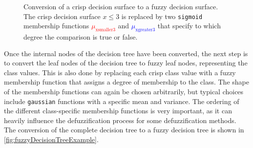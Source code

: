 \begin{figure}[H]
    \centering
    \caption[Conversion of crisp tree node into fuzzy tree node]{Conversion of a crisp decision surface to a fuzzy decision surface. The crisp decision surface $x \leq 3$ is replaced by two \texttt{sigmoid} membership functions \textcolor{red}{$\mu_{\text{xsmaller3}}$} and \textcolor{blue}{$\mu_{\text{xgreater3}}$} that specify to which degree the comparison is true or false.}
    \label{fig:fuzzyMembershipFunctions}
\end{figure}


Once the internal nodes of the decision tree have been converted, the next step is to convert the leaf nodes of the decision tree to fuzzy leaf nodes, representing the class values. This is also done by replacing each crisp class value with a fuzzy membership function that assigns a degree of membership to the class. The shape of the membership functions can again be chosen arbitrarily, but typical choices include \texttt{gaussian} functions with a specific mean and variance. The ordering of the different class-specific membership functions is very important, as it can heavily influence the defuzzification process for some defuzzification methods. The conversion of the complete decision tree to a fuzzy decision tree is shown in \autoref{fig:fuzzyDecisionTreeExample}.


